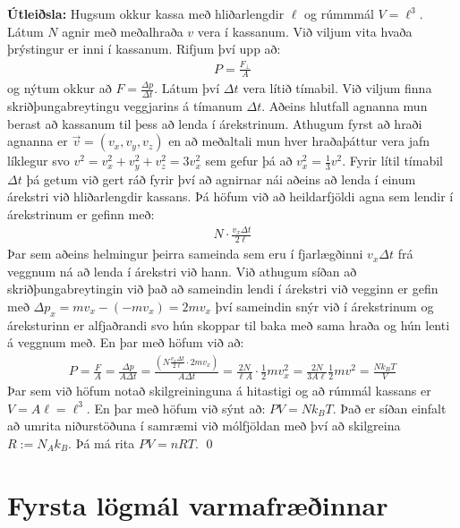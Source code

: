 \ifdefined \wholebook \else\documentclass[oneside]{book}\usepackage{EdlBook}\graphicspath{{figures/}}
\begin{document}
\textbf{Útleiðsla:} Hugsum okkur kassa með hliðarlengdir $\ell$ og rúmmmál $V = \ell^3$. Látum $N$ agnir með meðalhraða $v$ vera í kassanum. Við viljum vita hvaða þrýstingur er inni í kassanum. Rifjum því upp að:
\begin{align*}
    P = \frac{F_{\perp}}{A}
\end{align*}
og nýtum okkur að $F = \frac{\Delta p}{\Delta t}$. Látum því $\Delta t$ vera lítið tímabil. Við viljum finna skriðþungabreytingu veggjarins á tímanum $\Delta t$. Aðeins hlutfall agnanna mun berast að kassanum til þess að lenda í árekstrinum. Athugum fyrst að hraði agnanna er $\Vec{v} = (v_x, v_y, v_z)$ en að meðaltali mun hver hraðaþáttur vera jafn líklegur svo $v^2 = v_x^2 + v_y^2 + v_z^2 = 3v_x^2$ sem gefur þá að $v_x^2 = \frac{1}{3}v^2$. Fyrir lítil tímabil $\Delta t$ þá getum við gert ráð fyrir því að agnirnar nái aðeins að lenda í einum árekstri við hliðarlengdir kassans. Þá höfum við að heildarfjöldi agna sem lendir í árekstrinum er gefinn með:
\begin{align*}
    N \cdot \frac{v_x \Delta t}{2 \ell}
\end{align*}
Þar sem aðeins helmingur þeirra sameinda sem eru í fjarlægðinni $v_x \Delta t$ frá veggnum ná að lenda í árekstri við hann. Við athugum síðan að skriðþungabreytingin við það að sameindin lendi í árekstri við vegginn er gefin með $\Delta p_x = mv_x - (-mv_x) = 2mv_x$ því sameindin snýr við í árekstrinum og áreksturinn er alfjaðrandi svo hún skoppar til baka með sama hraða og hún lenti á veggnum með. En þar með höfum við að:
\begin{align*}
   P = \frac{F}{A} = \frac{\Delta p}{A\Delta t} = \frac{ \left( N \frac{v_x \Delta t}{2\ell} \cdot 2mv_x  \right)}{A\Delta t} = \frac{2N}{\ell A} \cdot \frac{1}{2}mv_x^2 = \frac{2N}{3A\ell}\frac{1}{2}mv^2 = \frac{N k_B T}{V}
\end{align*}
Þar sem við höfum notað skilgreininguna á hitastigi og að rúmmál kassans er $V = A \ell = \ell^3$. En þar með höfum við sýnt að: $PV = Nk_B T$. Það er síðan einfalt að umrita niðurstöðuna í samræmi við mólfjöldan með því að skilgreina $R := N_A k_B$. Þá má rita $PV = nRT$. \qed

\section{Fyrsta lögmál varmafræðinnar}
\end{document}
